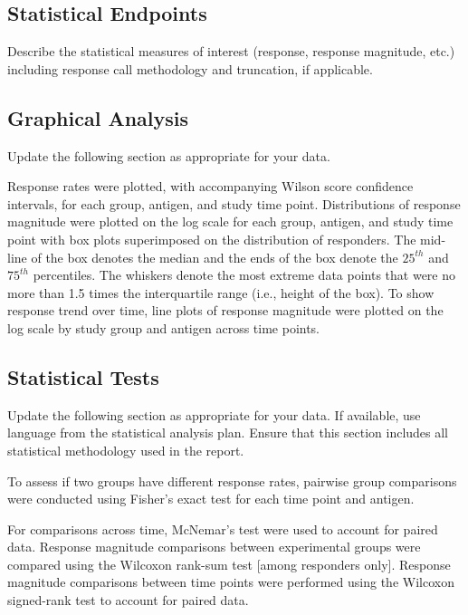 \documentclass[11pt]{article}
\begin{document}
\hypertarget{statistical-endpoints}{%
\subsection{Statistical Endpoints}\label{statistical-endpoints}}

Describe the statistical measures of interest (response, response magnitude, etc.)
including response call methodology and truncation, if applicable.

\hypertarget{graphical-analysis}{%
\subsection{Graphical Analysis}\label{graphical-analysis}}

Update the following section as appropriate for your data.

Response rates were plotted, with accompanying Wilson score confidence intervals,
for each group, antigen, and study time point.
Distributions of response magnitude were plotted on the log scale for each
group, antigen, and study time point with box plots superimposed on the
distribution of responders.
The mid-line of the box denotes the median and the ends of the box denote
the \(25^{th}\) and \(75^{th}\) percentiles.
The whiskers denote the most extreme data points that were no more than 1.5
times the interquartile range (i.e., height of the box).
To show response trend over time, line plots of response magnitude were plotted
on the log scale by study group and antigen across time points.

\hypertarget{statistical-tests}{%
\subsection{Statistical Tests}\label{statistical-tests}}

Update the following section as appropriate for your data. If available, use
language from the statistical analysis plan. Ensure that this section includes
all statistical methodology used in the report.

To assess if two groups have different response rates, pairwise group
comparisons were conducted using Fisher's exact test for each time point and
antigen.

For comparisons across time, McNemar's test were used to account for paired data.
Response magnitude comparisons between experimental groups were compared using
the Wilcoxon rank-sum test {[}among responders only{]}.
Response magnitude comparisons between time points were performed using the
Wilcoxon signed-rank test to account for paired data.
\end{document}
